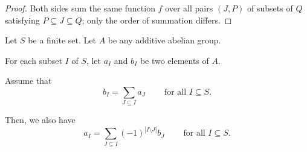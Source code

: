 \begin{proof}
Both sides sum the same function $f$ over all pairs $(J, P)$ of subsets
of $Q$ satisfying $P \subseteq J \subseteq Q$; only the order of
summation differs.
\end{proof}

\begin{theorem}
\label{thm.pie.moeb}
\leantarget
\leanok
Let $S$ be a finite set. Let
$A$ be any additive abelian group.

For each subset $I$ of $S$, let $a_{I}$ and $b_{I}$ be two elements of $A$.

Assume that
\begin{equation}
b_{I}=\sum_{J\subseteq I}a_{J}\ \ \ \ \ \ \ \ \ \ \text{for all }I\subseteq S.
\label{eq.thm.pie.moeb.ass}
\end{equation}


Then, we also have
\begin{equation}
a_{I}=\sum_{J\subseteq I}\left(  -1\right)  ^{\left\vert I\setminus
J\right\vert }b_{J}\ \ \ \ \ \ \ \ \ \ \text{for all }I\subseteq S.
\label{eq.thm.pie.moeb.claim}
\end{equation}
\end{theorem}

